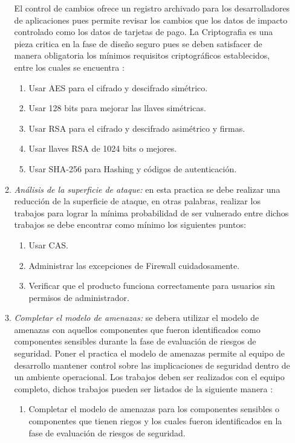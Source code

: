 \documentclass[runningheads,a4paper]{llncs}
\begin{document}
\begin{enumerate}
\begin{enumerate}
El control de cambios ofrece un registro archivado para los desarrolladores de aplicaciones pues permite revisar los cambios que los datos de impacto controlado como los datos de tarjetas de pago. La \gls{Criptografia} es una pieza critica en la fase de diseño seguro pues se deben satisfacer de manera obligatoria los mínimos requisitos criptográficos establecidos, entre los cuales se encuentra \cite{SDLWhitePaper}:  
\\
\begin{enumerate}
	\item Usar \gls{AES} para el cifrado y descifrado simétrico. 
	\item Usar 128 bits para mejorar las llaves simétricas.
	\item Usar RSA para el cifrado y descifrado asimétrico y firmas.
	\item Usar llaves RSA de 1024 bits o mejores.
	\item Usar SHA-256 para \gls{Hashing} y códigos de autenticación.\\                                                                        
\end{enumerate}

\item \textit{Análisis de la superficie de ataque: }en esta practica se debe realizar una reducción de la superficie de ataque, en otras palabras, realizar los trabajos para lograr la mínima probabilidad de ser vulnerado entre dichos trabajos se debe encontrar como mínimo los siguientes puntos:\\


\begin{enumerate}
	\item Usar \gls{CAS}.
	\item Administrar las excepciones de \gls{Firewall} cuidadosamente.
	\item Verificar que el producto funciona correctamente para usuarios sin permisos de administrador.\\
\end{enumerate}

\item \textit{Completar el modelo de amenazas: } se debera utilizar el modelo de amenazas con aquellos componentes que fueron identificados como componentes sensibles durante la fase de evaluación de riesgos de seguridad. Poner el practica el modelo de amenazas permite al equipo de desarrollo mantener control sobre las implicaciones de seguridad dentro de un ambiente operacional. Los trabajos deben ser realizados con el equipo completo, dichos trabajos pueden ser listados de la siguiente manera \cite{SDLWhitePaper}:
\\
\begin{enumerate}
	\item Completar el modelo de amenazas para los componentes sensibles  o componentes que tienen riegos y los cuales fueron identificados en la fase de evaluación de riesgos de seguridad. \\
	

\end{enumerate}
\end{enumerate}
\end{enumerate}
\end{document}
